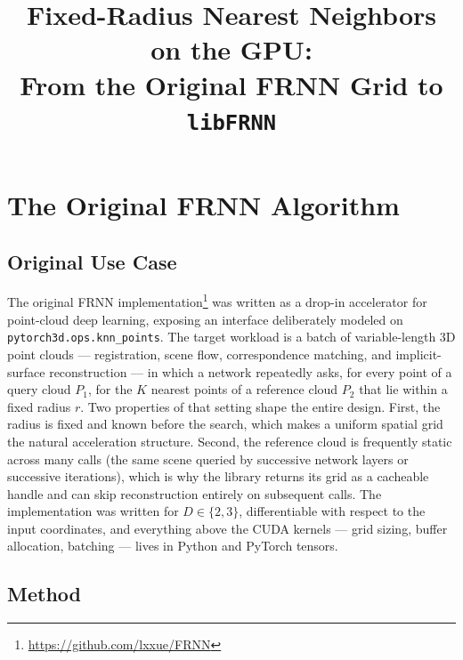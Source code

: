 \documentclass[11pt]{article}
\title{Fixed-Radius Nearest Neighbors on the GPU:\\
       From the Original FRNN Grid to \texttt{libFRNN}}
\date{}
\begin{document}
\maketitle

\section{The Original FRNN Algorithm}
\label{sec:original}

\subsection{Original Use Case}
\label{sec:original-usecase}

The original FRNN implementation\footnote{\url{https://github.com/lxxue/FRNN}}
was written as a drop-in accelerator for point-cloud deep learning, exposing an
interface deliberately modeled on \texttt{pytorch3d.ops.knn\_points}. The target
workload is a batch of variable-length 3D point clouds --- registration, scene
flow, correspondence matching, and implicit-surface reconstruction --- in which
a network repeatedly asks, for every point of a query cloud $P_1$, for the $K$
nearest points of a reference cloud $P_2$ that lie within a fixed radius $r$.
Two properties of that setting shape the entire design. First, the radius is
fixed and known before the search, which makes a uniform spatial grid the
natural acceleration structure. Second, the reference cloud is frequently
static across many calls (the same scene queried by successive network layers
or successive iterations), which is why the library returns its grid as a
cacheable handle and can skip reconstruction entirely on subsequent calls. The
implementation was written for $D \in \{2,3\}$, differentiable with respect to
the input coordinates, and everything above the CUDA kernels --- grid sizing,
buffer allocation, batching --- lives in Python and PyTorch tensors.

\subsection{Method}
\label{sec:original-method}
\end{document}
